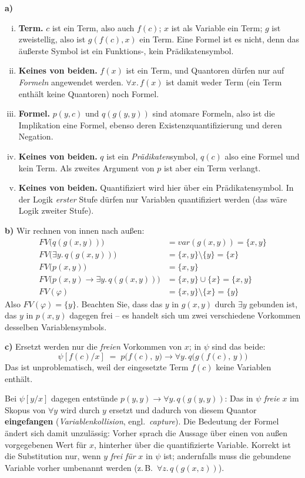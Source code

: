 \begin{loesung}
\textbf{a)}
\begin{enumerate}[(i)]
  \item \textbf{Term.} $c$ ist ein Term, also auch $f(c)$; $x$ ist als Variable ein Term; $g$ ist zweistellig, also ist $g(f(c),x)$ ein Term. Eine Formel ist es nicht, denn das äußerste Symbol ist ein Funktions-, kein Prädikatensymbol.
  \item \textbf{Keines von beiden.} $f(x)$ ist ein Term, und Quantoren dürfen nur auf \emph{Formeln} angewendet werden. $\forall x.\,f(x)$ ist damit weder Term (ein Term enthält keine Quantoren) noch Formel.
  \item \textbf{Formel.} $p(y,c)$ und $q(g(y,y))$ sind atomare Formeln, also ist die Implikation eine Formel, ebenso deren Existenzquantifizierung und deren Negation.
  \item \textbf{Keines von beiden.} $q$ ist ein \emph{Prädikaten}symbol, $q(c)$ also eine Formel und kein Term. Als zweites Argument von $p$ ist aber ein Term verlangt.
  \item \textbf{Keines von beiden.} Quantifiziert wird hier über ein Prädikatensymbol. In der Logik \emph{erster} Stufe dürfen nur Variablen quantifiziert werden (das wäre Logik zweiter Stufe).
\end{enumerate}

\textbf{b)} Wir rechnen von innen nach außen:
\begin{align*}
  FV\big(q(g(x,y))\big) &= var(g(x,y)) = \{x,y\} \\
  FV\big(\exists y.\, q(g(x,y))\big) &= \{x,y\}\setminus\{y\} = \{x\} \\
  FV\big(p(x,y)\big) &= \{x,y\} \\
  FV\big(p(x,y)\to\exists y.\,q(g(x,y))\big) &= \{x,y\}\cup\{x\} = \{x,y\} \\
  FV(\varphi) &= \{x,y\}\setminus\{x\} = \{y\}
\end{align*}
Also $FV(\varphi)=\{y\}$. Beachten Sie, dass das $y$ in $g(x,y)$ durch $\exists y$ gebunden ist, das $y$ in $p(x,y)$ dagegen frei -- es handelt sich um zwei verschiedene Vorkommen desselben Variablensymbols.

\textbf{c)} Ersetzt werden nur die \emph{freien} Vorkommen von $x$; in $\psi$ sind das beide:
\[
  \psi[f(c)/x] \;=\; p\big(f(c),\,y\big) \to \forall y.\, q\big(g(f(c),\,y)\big)
\]
Das ist unproblematisch, weil der eingesetzte Term $f(c)$ keine Variablen enthält.

Bei $\psi[y/x]$ dagegen entstünde $p(y,y)\to\forall y.\,q(g(y,y))$: Das in $\psi$ \emph{freie} $x$ im Skopus von $\forall y$ wird durch $y$ ersetzt und dadurch von diesem Quantor \textbf{eingefangen} (\emph{Variablenkollision}, engl.\ \emph{capture}). Die Bedeutung der Formel ändert sich damit unzulässig: Vorher sprach die Aussage über einen von außen vorgegebenen Wert für $x$, hinterher über die quantifizierte Variable. Korrekt ist die Substitution nur, wenn $y$ \emph{frei für} $x$ in $\psi$ ist; andernfalls muss die gebundene Variable vorher umbenannt werden (z.\,B.\ $\forall z.\,q(g(x,z))$).
\end{loesung}

